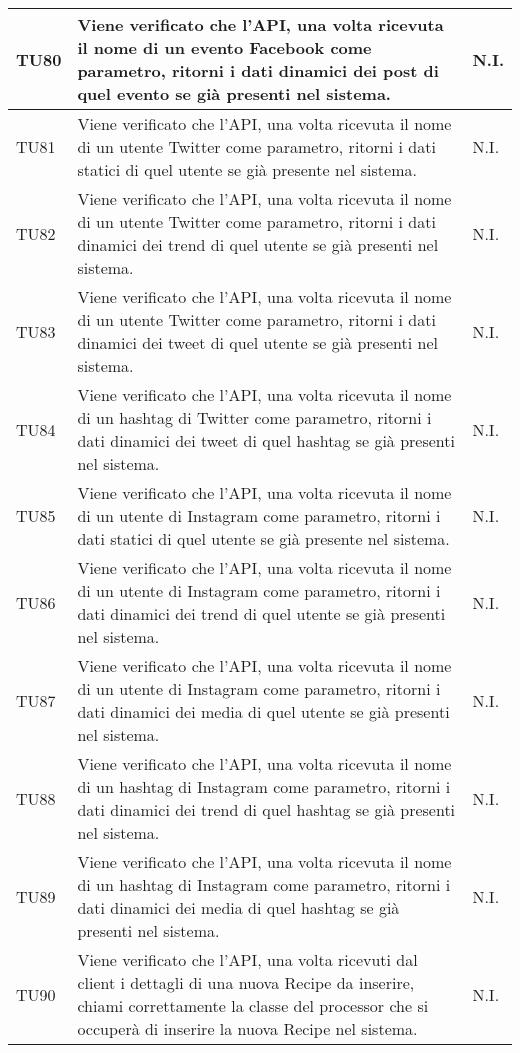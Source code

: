 \begin{center}
\begin{longtable}{| p{2cm} | p{8cm} | p{2.5cm} |}
					\hline
					TU80 & Viene verificato che l'API, una volta ricevuta il nome di un evento Facebook come parametro, ritorni i dati dinamici dei post di quel evento se già presenti nel sistema. & N.I.\\
					\hline
					TU81 & Viene verificato che l'API, una volta ricevuta il nome di un utente Twitter come parametro, ritorni i dati statici di quel utente se già presente nel sistema. & N.I.\\
					\hline
					TU82 & Viene verificato che l'API, una volta ricevuta il nome di un utente Twitter come parametro, ritorni i dati dinamici dei trend di quel utente se già presenti nel sistema. & N.I.\\
					\hline
					TU83 & Viene verificato che l'API, una volta ricevuta il nome di un utente Twitter come parametro, ritorni i dati dinamici dei tweet di quel utente se già presenti nel sistema. & N.I.\\
					\hline
					TU84 & Viene verificato che l'API, una volta ricevuta il nome di un hashtag di Twitter come parametro, ritorni i dati dinamici dei tweet di quel hashtag se già presenti nel sistema. & N.I.\\
					\hline
					TU85 & Viene verificato che l'API, una volta ricevuta il nome di un utente di Instagram come parametro, ritorni i dati statici di quel utente se già presente nel sistema. & N.I.\\
					\hline
					TU86 & Viene verificato che l'API, una volta ricevuta il nome di un utente di Instagram come parametro, ritorni i dati dinamici dei trend di quel utente se già presenti nel sistema. & N.I.\\
					\hline
					TU87 & Viene verificato che l'API, una volta ricevuta il nome di un utente di Instagram come parametro, ritorni i dati dinamici dei media di quel utente se già presenti nel sistema. & N.I.\\
					\hline
					TU88 & Viene verificato che l'API, una volta ricevuta il nome di un hashtag di Instagram come parametro, ritorni i dati dinamici dei trend di quel hashtag se già presenti nel sistema. & N.I.\\
					\hline
					TU89 & Viene verificato che l'API, una volta ricevuta il nome di un hashtag di Instagram come parametro, ritorni i dati dinamici dei media di quel hashtag se già presenti nel sistema. & N.I.\\
					\hline
					TU90 & Viene verificato che l'API, una volta ricevuti dal client i dettagli di una nuova Recipe da inserire, chiami correttamente la classe del processor che si occuperà di inserire la nuova Recipe nel sistema. & N.I.\\

\end{longtable}
\end{center}
